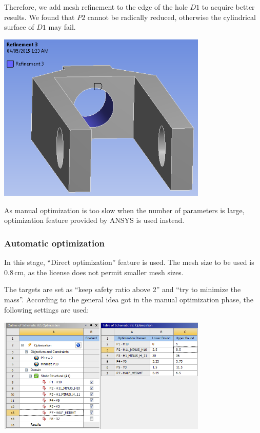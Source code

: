 \documentclass[a4paper,14pt]{extarticle}
\newcommand{\cm}{\,\si{\centi\meter}}
\begin{document}
Therefore, we add mesh refinement to the edge of the hole $D1$ to acquire better results. We found that $P2$ cannot be radically reduced, otherwise the cylindrical surface of $D1$ may fail.

\begin{center}
\includegraphics[width=0.75\textwidth]{REF3_SELF.PNG}
\end{center}

As manual optimization is too slow when the number of parameters is large, optimization feature provided by ANSYS is used instead.

\subsubsection{Automatic optimization}
In this stage, ``Direct optimization'' feature is used. The mesh size to be used is $0.8 \cm$, as the license does not permit smaller mesh sizes. 

The targets are set as ``keep safety ratio above 2'' and ``try to minimize the mass''. According to the general idea got in the manual optimization phase, the following settings are used:

\begin{center}
\includegraphics[width=0.75\textwidth]{OPT_BEFORE.PNG}
\end{center}
\end{document}
